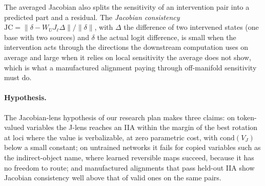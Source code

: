 \documentclass[11pt,a4paper]{article}
\begin{document}
The averaged Jacobian also splits the sensitivity of an intervention pair into a predicted part and a residual. The \emph{Jacobian consistency} $\mathrm{JC}=\|\delta-W_UJ_\ell\Delta\|/\|\delta\|$, with $\Delta$ the difference of two intervened states (one base with two sources) and $\delta$ the actual logit difference, is small when the intervention acts through the directions the downstream computation uses on average and large when it relies on local sensitivity the average does not show, which is what a manufactured alignment paying through off-manifold sensitivity must do.

\paragraph{Hypothesis.} The Jacobian-lens hypothesis of our research plan makes three claims: on token-valued variables the J-lens reaches an IIA within the margin of the best rotation at loci where the value is verbalizable, at zero parametric cost, with $\mathrm{cond}(V_J)$ below a small constant; on untrained networks it fails for copied variables such as the indirect-object name, where learned reversible maps succeed, because it has no freedom to route; and manufactured alignments that pass held-out IIA show Jacobian consistency well above that of valid ones on the same pairs.
\end{document}
